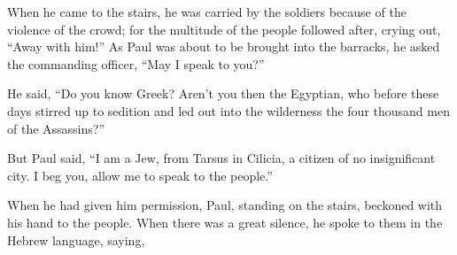 {\par }{\PP {}When he came to the stairs, he was carried by the soldiers because of the violence of the crowd;
for the multitude of the people followed after, crying out, “Away with him!”
As Paul was about to be brought into the barracks, he asked the commanding officer, “May I speak to you?”
\par }{\PP He said, “Do you know Greek?
Aren’t you then the Egyptian, who before these days stirred up to sedition and led out into the wilderness the four thousand men of the Assassins?”
\par }{\PP {}But Paul said, “I am a Jew, from Tarsus in Cilicia, a citizen of no insignificant city. I beg you, allow me to speak to the people.”
\par }{\PP {}When he had given him permission, Paul, standing on the stairs, beckoned with his hand to the people. When there was a great silence, he spoke to them in the Hebrew language, saying,

}
